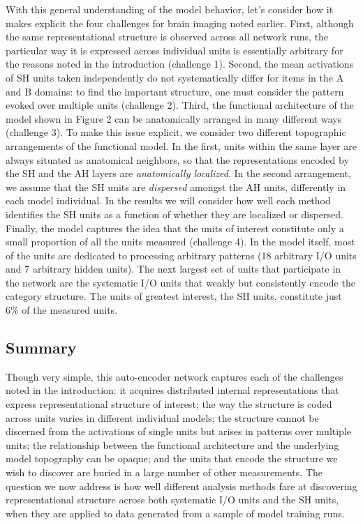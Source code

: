 With this general understanding of the model behavior, let's consider how it makes explicit the four challenges for brain imaging noted earlier. First, although the same representational structure is observed across all network runs, the particular way it is expressed across individual units is essentially arbitrary for the reasons noted in the introduction (challenge 1). Second, the mean activations of SH units taken independently do not systematically differ for items in the A and B domains: to find the important structure, one must consider the pattern evoked over multiple units (challenge 2). Third, the functional architecture of the model shown in Figure 2 can be anatomically arranged in many different ways (challenge 3). To make this issue explicit, we consider two different topographic arrangements of the functional model. In the first, units within the same layer are always situated as anatomical neighbors, so that the representations encoded by the SH and the AH layers are {\em anatomically localized}. In the second arrangement, we assume that the SH units are {\em dispersed} amongst the AH units, differently in each model individual. In the results we will consider how well each method identifies the SH units as a function of whether they are localized or dispersed. Finally, the model captures the idea that the units of interest constitute only a small proportion of all the units measured (challenge 4). In the model itself, most of the units are dedicated to processing arbitrary patterns (18 arbitrary I/O units and 7 arbitrary hidden units). The next largest set of units that participate in the network are the systematic I/O units that weakly but consistently encode the category structure. The units of greatest interest, the SH units, constitute just 6\% of the measured units. 

\subsection{Summary} 

Though very simple, this auto-encoder network captures each of the challenges noted in the introduction: it acquires distributed internal representations that express representational structure of interest; the way the structure is coded across units varies in different individual models; the structure cannot be discerned from the activations of single units but arises in patterns over multiple units; the relationship between the functional architecture and the underlying model topography can be opaque; and the units that encode the structure we wish to discover are buried in a large number of other measurements. The question we now address is how well different analysis methods fare at discovering representational structure across both systematic I/O units and the SH units, when they are applied to data generated from a sample of model training runs.
